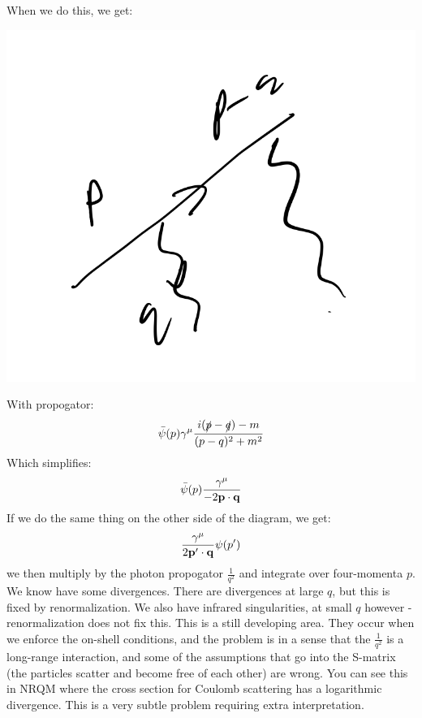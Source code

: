 When we do this, we get:
\begin{center}
    \includegraphics[scale=0.5]{Images/lec32p4.png}
\end{center}
With propogator:
\begin{equation}
    \bar{\psi}(p)\gamma^\mu \frac{i(\slashed{p} - \slashed{q}) - m}{(p - q)^2 + m^2}
\end{equation}
Which simplifies:
\begin{equation}
    \bar{\psi}(p)\frac{\gamma^\mu}{-2\mathbf{p} \cdot \mathbf{q}}
\end{equation}
If we do the same thing on the other side of the diagram, we get:
\begin{equation}
    \frac{\gamma^\mu}{2\mathbf{p}' \cdot \mathbf{q}}\psi(p')
\end{equation}
we then multiply by the photon propogator $\frac{1}{q^2}$ and integrate over four-momenta $p$. We know have some divergences. There are divergences at large $q$, but this is fixed by renormalization. We also have infrared singularities, at small $q$ however - renormalization does not fix this. This is a still developing area. They occur when we enforce the on-shell conditions, and the problem is in a sense that the $\frac{1}{q^2}$ is a long-range interaction, and some of the assumptions that go into the S-matrix (the particles scatter and become free of each other) are wrong. You can see this in NRQM where the cross section for Coulomb scattering has a logarithmic divergence. This is a very subtle problem requiring extra interpretation.

